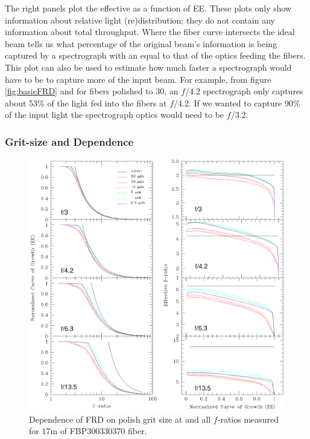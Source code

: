 The right panels plot the effective \fratio as a function of
EE. These plots only show information about relative light
(re)distribution; they do not contain any information about total
throughput.  Where the fiber curve intersects the ideal beam tells us
what percentage of the original beam's information is being captured
by a spectrograph with an \fratio equal to that of the optics feeding
the fibers. This plot can also be used to estimate how much faster a
spectrograph would have to be to capture more of the input beam. For
example, from figure \ref{fig:basicFRD} and for fibers polished to 30\mum, an $f$/4.2
spectrograph only captures about 53\% of the light fed into the fibers 
at $f$/4.2. If we wanted to capture 90\% of the input light the
spectrograph optics would need to be $f$/3.2.

\subsubsection{Grit-size and \fratio Dependence}
\label{FRD:sec:gritwave}
\begin{figure}[htp]
  \centering
  \includegraphics[width=\textwidth]{FRD/figs/gritplot.eps}
  \caption{\fixspacing\label{fig:grit}Dependence of FRD on polish grit size at
    \filty and all $f$-ratios measured for 17m of FBP300330370 fiber.}
\end{figure}

